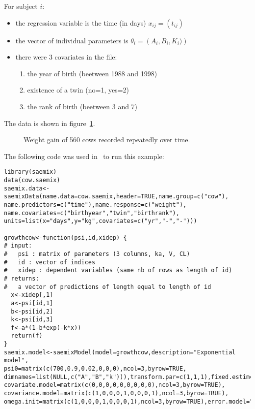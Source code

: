 {For subject $i$:
\begin{itemize}
\item the regression variable is the time (in days) $x_{ij} = (t_{ij})$
\item the vector of individual parameters is $\theta_i = \left(A_i, B_i, K_i) \right)$
\item there were 3 covariates in the file:
   \begin{enumerate}
   \item the year of birth (beetween 1988 and 1998)
   \item existence of a twin (no=1, yes=2)
   \item the rank of birth (beetween 3 and 7)
   \end{enumerate}
\end{itemize}

The data is shown in figure~\ref{fig:cowdata}.

\begin{figure}[!h]
\begin{center}
\end{center}
\caption{Weight gain of 560 cows recorded repeatedly over time.} \label{fig:cowdata}
\end{figure}

The following code was used in \R~to run this example:
\begin{verbatim}
library(saemix)
data(cow.saemix)
saemix.data<-saemixData(name.data=cow.saemix,header=TRUE,name.group=c("cow"), 
name.predictors=c("time"),name.response=c("weight"), 
name.covariates=c("birthyear","twin","birthrank"), 
units=list(x="days",y="kg",covariates=c("yr","-","-")))

growthcow<-function(psi,id,xidep) {
# input:
#   psi : matrix of parameters (3 columns, ka, V, CL)
#   id : vector of indices 
#   xidep : dependent variables (same nb of rows as length of id)
# returns:
#   a vector of predictions of length equal to length of id
  x<-xidep[,1]
  a<-psi[id,1]
  b<-psi[id,2]
  k<-psi[id,3]
  f<-a*(1-b*exp(-k*x))
  return(f)
}
saemix.model<-saemixModel(model=growthcow,description="Exponential model",  
psi0=matrix(c(700,0.9,0.02,0,0,0),ncol=3,byrow=TRUE, 
dimnames=list(NULL,c("A","B","k"))),transform.par=c(1,1,1),fixed.estim=c(1,1,1), 
covariate.model=matrix(c(0,0,0,0,0,0,0,0,0),ncol=3,byrow=TRUE), 
covariance.model=matrix(c(1,0,0,0,1,0,0,0,1),ncol=3,byrow=TRUE), 
omega.init=matrix(c(1,0,0,0,1,0,0,0,1),ncol=3,byrow=TRUE),error.model="constant")


\end{verbatim}}
